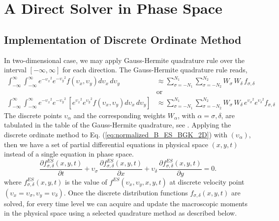 \documentclass{rsproca}%
\begin{document}
\section{A Direct Solver in Phase Space}
\label{sec:4}
\subsection{Implementation of Discrete Ordinate Method}
In two-dimensional case, we may apply Gauss-Hermite quadrature rule over the interval $[-\infty,\infty]$ for each direction.  The Gauss-Hermite quadrature rule reads,
\begin{align}
\int^{\infty}_{-\infty}\int^{\infty}_{-\infty}{e^{-{\upsilon_x}^2}e^{-{\upsilon_y}^2}f(\upsilon_x,\upsilon_y)d\upsilon_x\,d\upsilon_y} &\approx \sum^{N_1}_{\sigma=-N_1}\sum^{N_2}_{\sigma=-N_2}{W_\sigma\,W_\delta\, f_{\sigma,\delta}} \\
&\text{or} \nonumber \\
\int^{\infty}_{-\infty}\int^{\infty}_{-\infty}{e^{-{\upsilon_x}^2}e^{-{\upsilon_y}^2}\,[e^{{\upsilon_x}^2}e^{{\upsilon_y}^2}f(\upsilon_x,\upsilon_y) d\upsilon_x\,d\upsilon_y]} &\approx \sum^{N_1}_{\sigma=-N_1}\sum^{N_2}_{\sigma=-N_2}{W_\sigma\,W_\delta\,e^{{\upsilon_\sigma}^2}e^{{\upsilon_\delta}^2}f_{\sigma,\delta}}
\end{align}
The discrete points $\upsilon_\alpha$ and the corresponding weights $W_\alpha$, with $\alpha=\sigma,\delta$, are tabulated in the table of the Gauss-Hermite quadrature, see \cite{abramowitz+stegun}.
Applying the discrete ordinate method to Eq. (\ref{eq:normalized_B_ES_BGK_2D}) with $(\upsilon_\alpha)$, then we have a set of partial differential equations in physical space $(x,y,t)$  instead of a single equation in phase space.
\begin{equation}
\frac{\partial f^{ES}_{\sigma,\delta}(x,y,t)}{\partial t} + {\upsilon}_{\sigma}\,\frac{\partial f^{ES}_{\sigma,\delta} (x,y,t)}{\partial x} + \upsilon_{\delta}\,\frac{\partial f^{ES}_{\sigma,\delta} (x,y,t)}{\partial y} = 0.
\label{eq:normalized_B_ES_BGK_2D_withDOM}
\end{equation}
where $f^{ES}_{\sigma,\delta}(x,y,t)$ is the value of $f^{ES}(\upsilon_x,\upsilon_y,x,y,t)$ at discrete velocity point $(\upsilon_x=\upsilon_\sigma,\upsilon_y=\upsilon_\delta)$.
Once the discrete distribution functions $f_{\sigma,\delta}(x,y,t)$ are solved, for every time level we can acquire and update the macroscopic moments in the physical space using a selected quadrature method as described below.
\end{document}

